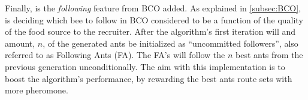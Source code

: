 Finally, is the \textit{following} feature from BCO added. As explained in \vref{subsec:BCO}, is deciding which bee to follow in BCO considered to be a function of the quality of the food source to the recruiter. After the algorithm's first iteration will and amount, $n$, of the generated ants be initialized as ``uncommitted followers'', also referred to as Following Ants (FA). The FA's will follow the $n$ best ants from the previous generation unconditionally. The aim with this implementation is to boost the algorithm's performance, by rewarding the best ants route sets with more pheromone.





